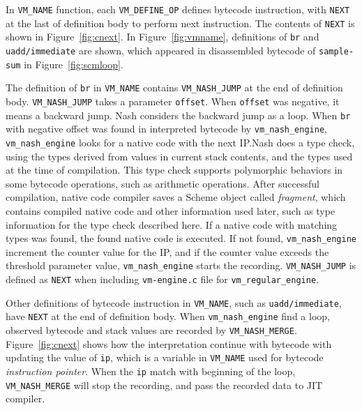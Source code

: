 \documentclass[preprint, numbers]{sigplanconf}
\begin{document}
In \texttt{VM\_NAME} function, each \texttt{VM\_DEFINE\_OP} defines bytecode
instruction, with \texttt{NEXT} at the last of definition body to perform next
instruction. The contents of \texttt{NEXT} is shown in
Figure~\hyperref[fig:cnext]{\ref{fig:cnext}}. In
Figure~\hyperref[fig:vmname]{\ref{fig:vmname}}, definitions of \texttt{br} and
\texttt{uadd/immediate} are shown, which appeared in disassembled bytecode of
\texttt{sample-sum} in Figure~\hyperref[fig:scmloop]{\ref{fig:scmloop}}.

The definition of \texttt{br} in \texttt{VM\_NAME} contains
\texttt{VM\_NASH\_JUMP} at the end of definition body. \texttt{VM\_NASH\_JUMP}
takes a parameter \texttt{offset}. When \texttt{offset} was negative, it means
a backward jump. Nash considers the backward jump as a loop. When \texttt{br}
with negative offset was found in interpreted bytecode by
\texttt{vm\_nash\_engine}, \texttt{vm\_nash\_engine} looks for a native code
with the next IP.\@ Nash does a type check, using the types derived from
values in current stack contents, and the types used at the time of
compilation. This type check supports polymorphic behaviors in some bytecode
operations, such as arithmetic operations. After successful compilation,
native code compiler saves a Scheme object called \textit{fragment}, which
contains compiled native code and other information used later, such as type
information for the type check described here. If a native code with matching
types was found, the found native code is executed. If not found,
\texttt{vm\_nash\_engine} increment the counter value for the IP, and if the
counter value exceeds the threshold parameter value, \texttt{vm\_nash\_engine}
starts the recording. \texttt{VM\_NASH\_JUMP} is defined as \texttt{NEXT} when
including \texttt{vm-engine.c} file for \texttt{vm\_regular\_engine}.

Other definitions of bytecode instruction in \texttt{VM\_NAME}, such as
\texttt{uadd/immediate}, have \texttt{NEXT} at the end of definition
body. When \texttt{vm\_nash\_engine} find a loop, observed bytecode and stack
values are recorded by
\texttt{VM\_NASH\_MERGE}. Figure~\hyperref[fig:cnext]{\ref{fig:cnext}} shows
how the interpretation continue with bytecode with updating the value of
\texttt{ip}, which is a variable in \texttt{VM\_NAME} used for bytecode
\textit{instruction pointer}. When the \texttt{ip} match with beginning of the
loop, \texttt{VM\_NASH\_MERGE} will stop the recording, and pass the recorded
data to JIT compiler.
\end{document}
